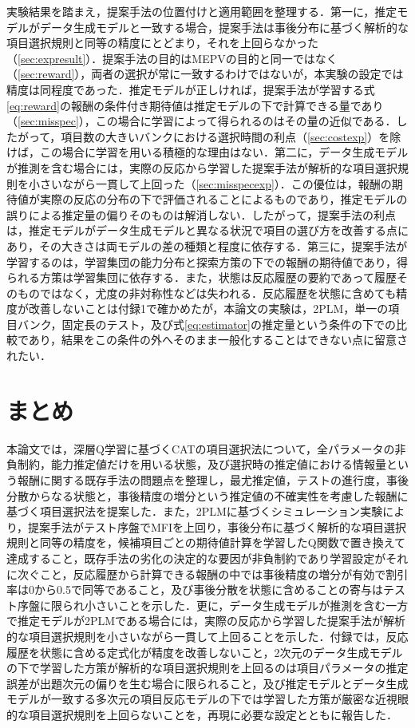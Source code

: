 \documentclass[a4paper,12pt,oneside,openany]{jsbook}
\begin{document}
実験結果を踏まえ，提案手法の位置付けと適用範囲を整理する．第一に，推定モデルがデータ生成モデルと一致する場合，提案手法は事後分布に基づく解析的な項目選択規則と同等の精度にとどまり，それを上回らなかった（\ref{sec:expresult}）．提案手法の目的はMEPVの目的と同一ではなく（\ref{sec:reward}），両者の選択が常に一致するわけではないが，本実験の設定では精度は同程度であった．推定モデルが正しければ，提案手法が学習する式\eqref{eq:reward}の報酬の条件付き期待値は推定モデルの下で計算できる量であり（\ref{sec:misspec}），この場合に学習によって得られるのはその量の近似である．したがって，項目数の大きいバンクにおける選択時間の利点（\ref{sec:costexp}）を除けば，この場合に学習を用いる積極的な理由はない．第二に，データ生成モデルが推測を含む場合には，実際の反応から学習した提案手法が解析的な項目選択規則を小さいながら一貫して上回った（\ref{sec:misspecexp}）．この優位は，報酬の期待値が実際の反応の分布の下で評価されることによるものであり，推定モデルの誤りによる推定量の偏りそのものは解消しない．したがって，提案手法の利点は，推定モデルがデータ生成モデルと異なる状況で項目の選び方を改善する点にあり，その大きさは両モデルの差の種類と程度に依存する．第三に，提案手法が学習するのは，学習集団の能力分布と探索方策の下での報酬の期待値であり，得られる方策は学習集団に依存する．また，状態は反応履歴の要約であって履歴そのものではなく，尤度の非対称性などは失われる．反応履歴を状態に含めても精度が改善しないことは付録1で確かめたが，本論文の実験は，2PLM，単一の項目バンク，固定長のテスト，及び式\eqref{eq:estimator}の推定量という条件の下での比較であり，結果をこの条件の外へそのまま一般化することはできない点に留意されたい．

\section{まとめ}\label{sec:conclusion}

本論文では，深層Q学習に基づくCATの項目選択法について，全パラメータの非負制約，能力推定値だけを用いる状態，及び選択時の推定値における情報量という報酬に関する既存手法の問題点を整理し，最尤推定値，テストの進行度，事後分散からなる状態と，事後精度の増分という推定値の不確実性を考慮した報酬に基づく項目選択法を提案した．また，2PLMに基づくシミュレーション実験により，提案手法がテスト序盤でMFIを上回り，事後分布に基づく解析的な項目選択規則と同等の精度を，候補項目ごとの期待値計算を学習したQ関数で置き換えて達成すること，既存手法の劣化の決定的な要因が非負制約であり学習設定がそれに次ぐこと，反応履歴から計算できる報酬の中では事後精度の増分が有効で割引率は0から0.5で同等であること，及び事後分散を状態に含めることの寄与はテスト序盤に限られ小さいことを示した．更に，データ生成モデルが推測を含む一方で推定モデルが2PLMである場合には，実際の反応から学習した提案手法が解析的な項目選択規則を小さいながら一貫して上回ることを示した．付録では，反応履歴を状態に含める定式化が精度を改善しないこと，2次元のデータ生成モデルの下で学習した方策が解析的な項目選択規則を上回るのは項目パラメータの推定誤差が出題次元の偏りを生む場合に限られること，及び推定モデルとデータ生成モデルが一致する多次元の項目反応モデルの下では学習した方策が厳密な近視眼的な項目選択規則を上回らないことを，再現に必要な設定とともに報告した．
\end{document}
